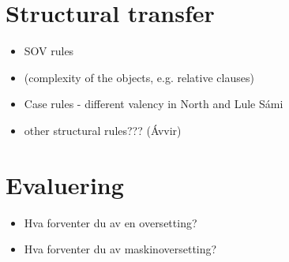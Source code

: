 \documentclass[a4paper,english,12pt]{article}
\begin{document}
\begin{spacing}{1.0}
\section{Structural transfer} 
\begin{itemize}
  \item SOV rules
  \item (complexity of the objects, e.g. relative clauses)
  \item Case rules - different valency in North and Lule Sámi
  \item other structural rules??? (Ávvir)
\end{itemize}


\section{Evaluering}


\begin{itemize}
\item Hva forventer du av en oversetting?  
\item Hva forventer du av maskinoversetting?
\end{itemize}

\end{spacing}
\end{document}
